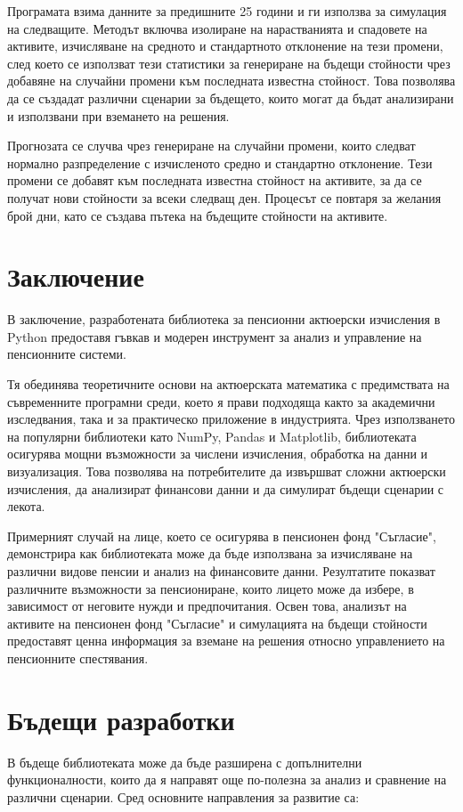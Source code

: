 \documentclass[a4paper,12pt]{article}
\begin{document}
Програмата взима данните за предишните 25 години и ги използва за симулация на следващите. Методът включва изолиране на нарастванията и спадовете на активите, изчисляване на средното и стандартното отклонение на тези промени, след което се използват тези статистики за генериране на бъдещи стойности чрез добавяне на случайни промени към последната известна стойност. Това позволява да се създадат различни сценарии за бъдещето, които могат да бъдат анализирани и използвани при вземането на решения.

Прогнозата се случва чрез генериране на случайни промени, които следват нормално разпределение с изчисленото средно и стандартно отклонение. Тези промени се добавят към последната известна стойност на активите, за да се получат нови стойности за всеки следващ ден. Процесът се повтаря за желания брой дни, като се създава пътека на бъдещите стойности на активите.
\newpage
\section{Заключение}
В заключение, разработената библиотека за пенсионни актюерски изчисления в Python предоставя гъвкав и модерен инструмент за анализ и управление на пенсионните системи.

Тя обединява теоретичните основи на актюерската математика с предимствата на съвременните програмни среди, което я прави подходяща както за академични изследвания, така и за практическо приложение в индустрията. Чрез използването на популярни библиотеки като NumPy, Pandas и Matplotlib, библиотеката осигурява мощни възможности за числени изчисления, обработка на данни и визуализация. Това позволява на потребителите да извършват сложни актюерски изчисления, да анализират финансови данни и да симулират бъдещи сценарии с лекота.

Примерният случай на лице, което се осигурява в пенсионен фонд "Съгласие", демонстрира как библиотеката може да бъде използвана за изчисляване на различни видове пенсии и анализ на финансовите данни. Резултатите показват различните възможности за пенсиониране, които лицето може да избере, в зависимост от неговите нужди и предпочитания. Освен това, анализът на активите на пенсионен фонд "Съгласие" и симулацията на бъдещи стойности предоставят ценна информация за вземане на решения относно управлението на пенсионните спестявания.

\section{Бъдещи разработки}
В бъдеще библиотеката може да бъде разширена с допълнителни функционалности, които да я направят още по-полезна за анализ и сравнение на различни сценарии. Сред основните направления за развитие са:
\end{document}
